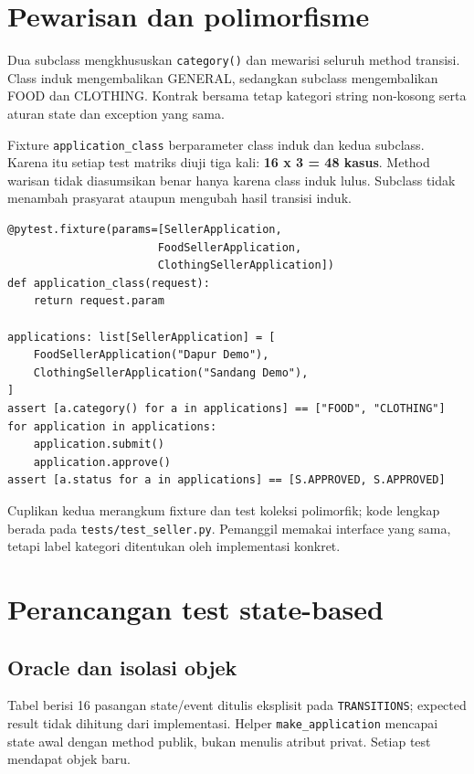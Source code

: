 \documentclass[11pt,a4paper]{article}
\begin{document}
\newpage
\section{Pewarisan dan polimorfisme}
Dua subclass mengkhususkan \texttt{category()} dan mewarisi seluruh method
transisi. Class induk mengembalikan GENERAL, sedangkan subclass mengembalikan
FOOD dan CLOTHING. Kontrak bersama tetap kategori string non-kosong serta
aturan state dan exception yang sama.


Fixture \texttt{application\_class} berparameter class induk dan kedua
subclass. Karena itu setiap test matriks diuji tiga kali: \textbf{16 x 3 = 48
kasus}. Method warisan tidak diasumsikan benar hanya karena class induk lulus.
Subclass tidak menambah prasyarat ataupun mengubah hasil transisi induk.

\begin{lstlisting}
@pytest.fixture(params=[SellerApplication,
                       FoodSellerApplication,
                       ClothingSellerApplication])
def application_class(request):
    return request.param

applications: list[SellerApplication] = [
    FoodSellerApplication("Dapur Demo"),
    ClothingSellerApplication("Sandang Demo"),
]
assert [a.category() for a in applications] == ["FOOD", "CLOTHING"]
for application in applications:
    application.submit()
    application.approve()
assert [a.status for a in applications] == [S.APPROVED, S.APPROVED]
\end{lstlisting}
Cuplikan kedua merangkum fixture dan test koleksi polimorfik; kode lengkap
berada pada \texttt{tests/test\_seller.py}. Pemanggil memakai interface
yang sama, tetapi label kategori ditentukan oleh implementasi konkret.

\newpage
\section{Perancangan test state-based}
\subsection{Oracle dan isolasi objek}
Tabel berisi 16 pasangan state/event ditulis eksplisit pada
\texttt{TRANSITIONS}; expected result tidak dihitung dari implementasi.
Helper \texttt{make\_application} mencapai state awal dengan method publik,
bukan menulis atribut privat. Setiap test mendapat objek baru.


\end{document}
